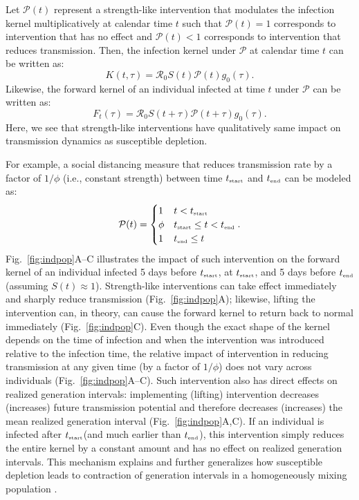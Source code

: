 \documentclass[12pt]{article}
\newcommand{\fref}[1]{Fig.~\ref{fig:#1}}
\newcommand{\Rx}[1]{\ensuremath{{\mathcal R}_{#1}}\xspace}
\newcommand{\Ro}{\Rx{0}}
\newcommand{\tsub}[2]{#1_{{\textrm{\tiny #2}}}}
\newcommand{\tstart}{\ensuremath{\tsub{t}{start}}\xspace}
\newcommand{\tend}{\ensuremath{\tsub{t}{end}}\xspace}
\newcommand{\PP}{{\mathcal P}}
\begin{document}
Let $\PP(t)$ represent a strength-like intervention that modulates the infection kernel multiplicatively at calendar time $t$ such that $\PP(t)=1$ corresponds to intervention that has no effect and $\PP(t) < 1$ corresponds to intervention that reduces transmission.
Then, the infection kernel under $\PP$ at calendar time $t$ can be written as:
\begin{equation}
K(t, \tau) = \Ro S(t) \PP(t) g_0(\tau).
\end{equation}
Likewise, the forward kernel of an individual infected at time $t$ under $\PP$ can be written as:
\begin{equation}
F_t(\tau) =  \Ro S(t+\tau) \PP(t + \tau) g_0(\tau).
\end{equation}
Here, we see that strength-like interventions have qualitatively same impact on transmission dynamics as susceptible depletion.

For example, a social distancing measure that reduces transmission rate by a factor of $1/\phi$ (i.e., constant strength) between time \tstart and \tend can be modeled as:
\begin{equation}
\PP(t) = \begin{cases}
1 & t < \tstart\\
\phi & \tstart \leq t < \tend\\
1 & \tend \leq t
\end{cases}.
\end{equation}
\fref{indpop}A--C illustrates the impact of such intervention on the forward kernel of an individual infected 5 days before $\tstart$, at $\tstart$, and 5 days before $\tend$ (assuming $S(t) \approx 1$).
Strength-like interventions can take effect immediately and sharply reduce transmission (\fref{indpop}A);
likewise, lifting the intervention can, in theory, can cause the forward kernel to return back to normal immediately (\fref{indpop}C).
Even though the exact shape of the kernel depends on the time of infection and when the intervention was introduced relative to the infection time, the relative impact of intervention in reducing transmission at any given time (by a factor of $1/\phi$) does not vary across individuals (\fref{indpop}A--C).
Such intervention also has direct effects on realized generation intervals:
implementing (lifting) intervention decreases (increases) future transmission potential and therefore decreases (increases) the mean realized generation interval (\fref{indpop}A,C).
If an individual is infected after \tstart (and much earlier than \tend), this intervention simply reduces the entire kernel by a constant amount and has no effect on realized generation intervals.
This mechanism explains and further generalizes how susceptible depletion leads to contraction of generation intervals in a homogeneously mixing population \citep{kenah2008generation,nishiura2010time,champredon2015intrinsic}. 
\end{document}
